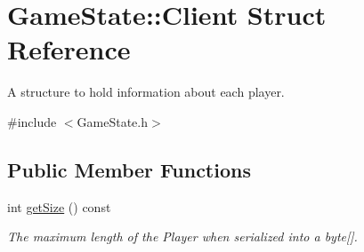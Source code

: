 \hypertarget{struct_game_state_1_1_client}{\section{Game\-State\-:\-:Client Struct Reference}
\label{struct_game_state_1_1_client}
}


A structure to hold information about each player.  




{\ttfamily \#include $<$Game\-State.\-h$>$}

\subsection*{Public Member Functions}
\begin{DoxyCompactItemize}
\item 
\hypertarget{struct_game_state_1_1_client_a1f13a8c1e037eed9b8b362436d066be0}{int \hyperlink{struct_game_state_1_1_client_a1f13a8c1e037eed9b8b362436d066be0}{get\-Size} () const }\label{struct_game_state_1_1_client_a1f13a8c1e037eed9b8b362436d066be0}

\begin{DoxyCompactList}\small\item\em The maximum length of the Player when serialized into a byte\mbox{[}\mbox{]}. \end{DoxyCompactList}\end{DoxyCompactItemize}
